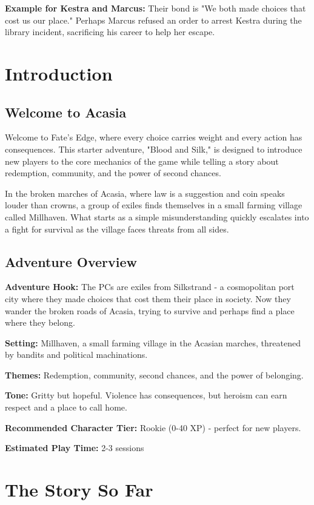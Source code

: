 \documentclass[11pt]{article}
\begin{document}
\textbf{Example for Kestra and Marcus:} Their bond is "We both made choices that cost us our place." Perhaps Marcus refused an order to arrest Kestra during the library incident, sacrificing his career to help her escape.

\section{Introduction}

\subsection{Welcome to Acasia}

Welcome to Fate's Edge, where every choice carries weight and every action has consequences. This starter adventure, "Blood and Silk," is designed to introduce new players to the core mechanics of the game while telling a story about redemption, community, and the power of second chances.

In the broken marches of Acasia, where law is a suggestion and coin speaks louder than crowns, a group of exiles finds themselves in a small farming village called Millhaven. What starts as a simple misunderstanding quickly escalates into a fight for survival as the village faces threats from all sides.

\subsection{Adventure Overview}

\textbf{Adventure Hook:} The PCs are exiles from Silkstrand - a cosmopolitan port city where they made choices that cost them their place in society. Now they wander the broken roads of Acasia, trying to survive and perhaps find a place where they belong.

\textbf{Setting:} Millhaven, a small farming village in the Acasian marches, threatened by bandits and political machinations.

\textbf{Themes:} Redemption, community, second chances, and the power of belonging.

\textbf{Tone:} Gritty but hopeful. Violence has consequences, but heroism can earn respect and a place to call home.

\textbf{Recommended Character Tier:} Rookie (0-40 XP) - perfect for new players.

\textbf{Estimated Play Time:} 2-3 sessions

\section{The Story So Far}
\end{document}
